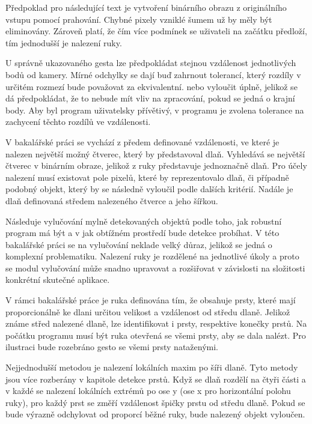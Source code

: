 Předpoklad pro následující text je vytvoření binárního obrazu z originálního vstupu pomocí prahování. Chybné pixely vzniklé šumem už by měly být eliminovány. Zároveň platí, že čím více podmínek se uživateli na začátku předloží, tím jednodušší je nalezení ruky. %

U správně ukazovaného gesta lze předpokládat stejnou vzdálenost jednotlivých bodů od kamery. Mírné odchylky se dají buď zahrnout tolerancí, který rozdíly v určitém rozmezí bude považovat za ekvivalentní. nebo vyloučit úplně, jelikož se dá předpokládat, že to nebude mít vliv na zpracování, pokud se jedná o krajní body. Aby byl program uživatelsky přívětivý, v programu je zvolena tolerance na zachycení těchto rozdílů ve vzdálenosti.

V bakalářské práci se vychází z předem definované vzdálenosti, ve které je nalezen největší možný čtverec, který by představoval dlaň. Vyhledává se největší čtverec v binárním obraze, jelikož z ruky představuje jednoznačně dlaň. Pro účely nalezení musí existovat pole pixelů, které by reprezentovalo dlaň, či případně podobný objekt, který by se následně vyloučil podle dalších kritérií. Nadále je dlaň definovaná středem nalezeného čtverce a jeho šířkou.

Následuje vylučování mylně detekovaných objektů podle toho, jak robustní program má být a v jak obtížném prostředí bude detekce probíhat. V této bakalářské práci se na vylučování neklade velký důraz, jelikož se jedná o komplexní problematiku. Nalezení ruky je rozdělené na jednotlivé úkoly a proto se modul vylučování může snadno upravovat a rozšiřovat v závislosti na složitosti konkrétní skutečné aplikace.

V rámci bakalářské práce je ruka definována tím, že obsahuje prsty, které mají proporcionálně ke dlani určitou velikost a vzdálenost od středu dlaně. Jelikož známe střed nalezené dlaně, lze identifikovat i prsty, respektive konečky prstů. Na počátku programu musí být ruka otevřená se všemi prsty, aby se dala nalézt. Pro ilustraci bude rozebráno gesto se všemi prsty nataženými. 

Nejjednodušší metodou je nalezení lokálních maxim po šíři dlaně. Tyto metody jsou více rozberány v kapitole detekce prstů. Když se dlaň rozdělí na čtyři části a v každé se nalezení lokálních extrémů po ose y (ose x pro horizontální polohu ruky), pro každý prst se změří vzdálenost špičky prstu od středu dlaně. Pokud se bude výrazně odchylovat od proporcí běžné ruky, bude nalezený objekt vyloučen.

